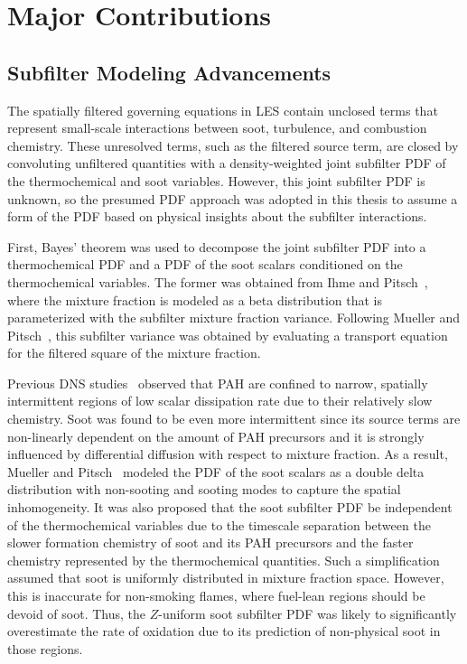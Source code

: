 \section{Major Contributions}
\label{sec:conclusion:contributions}

\subsection{Subfilter Modeling Advancements}
\label{sec:conclusion:contributions:subfilter}

The spatially filtered governing equations in LES contain unclosed terms that represent small-scale interactions between soot, turbulence, and combustion chemistry. These unresolved terms, such as the filtered source term, are closed by convoluting unfiltered quantities with a density-weighted joint subfilter PDF of the thermochemical and soot variables. However, this joint subfilter PDF is unknown, so the presumed PDF approach was adopted in this thesis to assume a form of the PDF based on physical insights about the subfilter interactions.

First, Bayes' theorem was used to decompose the joint subfilter PDF into a thermochemical PDF and a PDF of the soot scalars conditioned on the thermochemical variables. The former was obtained from Ihme and Pitsch~\cite{ihme2008}, where the mixture fraction is modeled as a beta distribution that is parameterized with the subfilter mixture fraction variance. Following Mueller and Pitsch~\cite{mueller2012}, this subfilter variance was obtained by evaluating a transport equation for the filtered square of the mixture fraction. 

Previous DNS studies~\cite{bisetti2012,attili2014,attili2015} observed that PAH are confined to narrow, spatially intermittent regions of low scalar dissipation rate due to their relatively slow chemistry. Soot was found to be even more intermittent since its source terms are non-linearly dependent on the amount of PAH precursors and it is strongly influenced by differential diffusion with respect to mixture fraction. As a result, Mueller and Pitsch~\cite{subfilterpdf2011} modeled the PDF of the soot scalars as a double delta distribution with non-sooting and sooting modes to capture the spatial inhomogeneity. It was also proposed that the soot subfilter PDF be independent of the thermochemical variables due to the timescale separation between the slower formation chemistry of soot and its PAH precursors and the faster chemistry represented by the thermochemical quantities. Such a simplification assumed that soot is uniformly distributed in mixture fraction space. However, this is inaccurate for non-smoking flames, where fuel-lean regions should be devoid of soot. Thus, the $Z$-uniform soot subfilter PDF was likely to significantly overestimate the rate of oxidation due to its prediction of non-physical soot in those regions.

